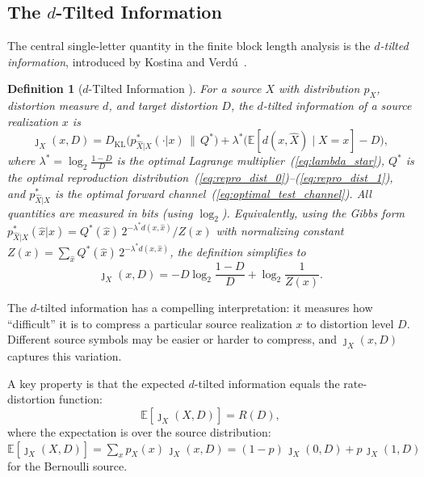 \documentclass[11pt]{article}
\newtheorem{definition}{Definition}[section]
\newcommand{\RD}{R(D)}
\newcommand{\E}{\mathbb{E}}
\begin{document}
\subsection{The $d$-Tilted Information}
\label{subsec:dtilted}

The central single-letter quantity in the finite block length analysis is the
\emph{$d$-tilted information}, introduced by Kostina and
Verd\'{u}~\cite{kostina2012}.

\begin{definition}[$d$-Tilted Information {\cite{kostina2012}}]
\label{def:dtilted}
For a source $X$ with distribution $p_X$, distortion measure $d$, and target
distortion $D$, the $d$-tilted information of a source realization $x$ is
\begin{equation}
\label{eq:dtilted}
\jmath_X(x, D) = D_{\mathrm{KL}}\!\bigl(p^*_{\hat{X}|X}(\cdot|x) \,\big\|\, Q^*\bigr)
+ \lambda^*\!\bigl(\E[d(x,\hat{X}) \mid X = x] - D\bigr),
\end{equation}
where $\lambda^* = \log_2\frac{1-D}{D}$ is the optimal Lagrange multiplier~(\ref{eq:lambda_star}),
$Q^*$ is the optimal reproduction distribution~(\ref{eq:repro_dist_0})--(\ref{eq:repro_dist_1}),
and $p^*_{\hat{X}|X}$ is the optimal forward channel~(\ref{eq:optimal_test_channel}).
All quantities are measured in bits (using $\log_2$).
Equivalently, using the Gibbs form $p^*_{\hat{X}|X}(\hat{x}|x)
= Q^*(\hat{x})\,2^{-\lambda^* d(x,\hat{x})}/Z(x)$ with normalizing constant
$Z(x) = \sum_{\hat{x}} Q^*(\hat{x})\,2^{-\lambda^* d(x,\hat{x})}$,
the definition simplifies to
\begin{equation}
\label{eq:dtilted_bits}
\jmath_X(x, D) = -D\log_2\frac{1-D}{D}
+ \log_2 \frac{1}{Z(x)}.
\end{equation}
\end{definition}

The $d$-tilted information has a compelling interpretation: it measures how
``difficult'' it is to compress a particular source realization $x$ to distortion
level $D$.
Different source symbols may be easier or harder to compress, and $\jmath_X(x, D)$
captures this variation.

A key property is that the expected $d$-tilted information equals the
rate-distortion function:
\begin{equation}
\label{eq:dtilted_mean}
\E[\jmath_X(X, D)] = \RD,
\end{equation}
where the expectation is over the source distribution:
$\E[\jmath_X(X, D)] = \sum_{x} p_X(x)\,\jmath_X(x, D)
= (1-p)\,\jmath_X(0, D) + p\,\jmath_X(1, D)$ for the Bernoulli source.
\end{document}
